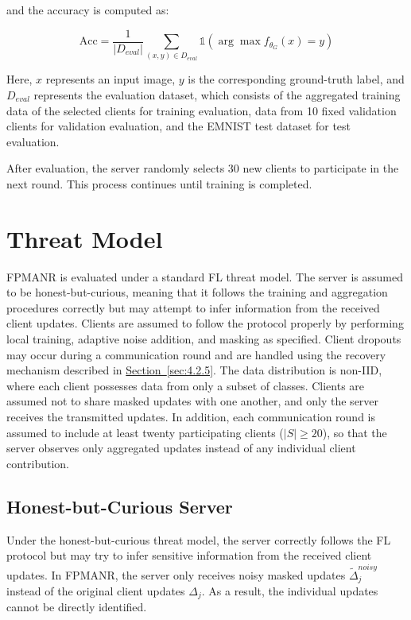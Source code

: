 \documentclass[a4paper,fleqn]{cas-dc}
\newcommand{\xsec}[1]{\hyperref[#1]{Section~\ref*{#1}}}
\begin{document}
and the accuracy is computed as:

\begin{equation}
\mathrm{Acc} = \frac{1}{\left| D_{eval} \right|} \sum_{(x, y) \in D_{eval}}{\mathbb{1}\left(\arg\max f_{\theta_{G}}(x) = y\right)}
\label{eq:12}
\end{equation}

Here, $x$ represents an input image, $y$ is the corresponding ground-truth label, and $D_{eval}$ represents the evaluation dataset, which consists of the aggregated training data of the selected clients for training evaluation, data from 10 fixed validation clients for validation evaluation, and the EMNIST test dataset for test evaluation.

After evaluation, the server randomly selects 30 new clients to participate in the next round. This process continues until training is completed.

\section{Threat Model}
\label{sec:5}

FPMANR is evaluated under a standard FL threat model. The server is assumed to be honest-but-curious, meaning that it follows the training and aggregation procedures correctly but may attempt to infer information from the received client updates. Clients are assumed to follow the protocol properly by performing local training, adaptive noise addition, and masking as specified. Client dropouts may occur during a communication round and are handled using the recovery mechanism described in \xsec{sec:4.2.5}. The data distribution is non-IID, where each client possesses data from only a subset of classes. Clients are assumed not to share masked updates with one another, and only the server receives the transmitted updates. In addition, each communication round is assumed to include at least twenty participating clients ($|S| \geq 20$), so that the server observes only aggregated updates instead of any individual client contribution.

\subsection{Honest-but-Curious Server}

Under the honest-but-curious threat model, the server correctly follows the FL protocol but may try to infer sensitive information from the received client updates. In FPMANR, the server only receives noisy masked updates ${\widetilde{\Delta}}_{j}^{noisy}$ instead of the original client updates $\Delta_{j}$. As a result, the individual updates cannot be directly identified.
\end{document}
